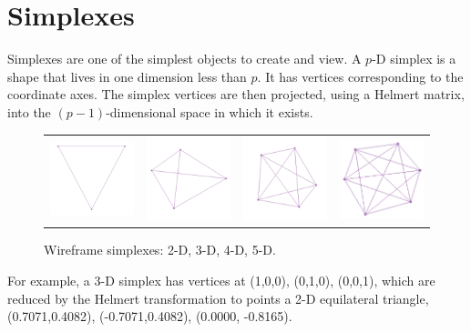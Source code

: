 \section{Simplexes}

Simplexes are one of the simplest objects to create and view. A $p$-D
simplex is a shape that lives in one dimension less than $p$. It has
vertices corresponding to the coordinate axes. The simplex vertices
are then projected, using a Helmert matrix, into the
$(p - 1)$-dimensional space in which it exists.

\begin{figure}[ht]
\centering
\begin{tabular}{cccc}
\includegraphics[width=1.2in]{fig/simplex2.pdf} & \includegraphics[width=1.2in]{fig/simplex3.pdf} &
\includegraphics[width=1.2in]{fig/simplex4.pdf} & \includegraphics[width=1.2in]{fig/simplex5.pdf}
\end{tabular}

\caption{Wireframe simplexes: 2-D, 3-D, 4-D, 5-D.}
\end{figure}

For example, a 3-D simplex has vertices at (1,0,0), (0,1,0), (0,0,1),
which are reduced by the Helmert transformation to points a 2-D
equilateral triangle, (0.7071,0.4082), (-0.7071,0.4082), (0.0000,
-0.8165).

